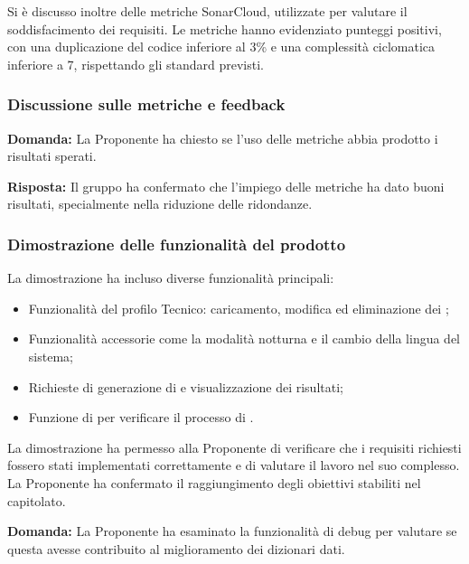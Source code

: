 \par Si è discusso inoltre delle metriche SonarCloud, utilizzate per valutare il soddisfacimento dei requisiti. Le metriche hanno evidenziato punteggi positivi, con una duplicazione del codice inferiore al 3\% e una complessità ciclomatica inferiore a 7, rispettando gli standard previsti.

\subsubsection{Discussione sulle metriche e feedback}

\par \textbf{Domanda:} La Proponente ha chiesto se l'uso delle metriche abbia prodotto i risultati sperati.

\par \textbf{Risposta:} Il gruppo ha confermato che l'impiego delle metriche ha dato buoni risultati, specialmente nella riduzione delle ridondanze.

\subsubsection{Dimostrazione delle funzionalità del prodotto}

\par La dimostrazione ha incluso diverse funzionalità principali:
\begin{itemize}
    \item Funzionalità del profilo Tecnico: caricamento, modifica ed eliminazione dei ;
    \item Funzionalità accessorie come la modalità notturna e il cambio della lingua del sistema;
    \item Richieste di generazione di  e visualizzazione dei risultati; 
    \item Funzione di  per verificare il processo di .
\end{itemize}

\par La dimostrazione ha permesso alla Proponente di verificare che i requisiti richiesti fossero stati implementati correttamente e di valutare il lavoro nel suo complesso. La Proponente ha confermato il raggiungimento degli obiettivi stabiliti nel capitolato. 

\par \textbf{Domanda:} La Proponente ha esaminato la funzionalità di debug per valutare se questa avesse contribuito al miglioramento dei dizionari dati.

